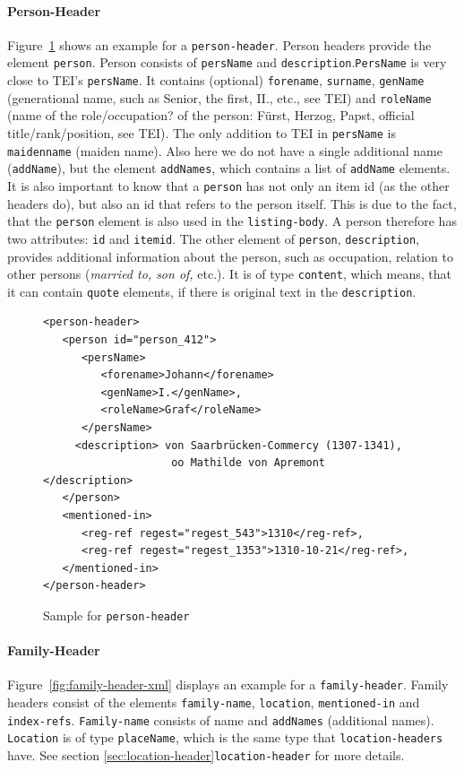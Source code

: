 \paragraph{Person-Header}
Figure~\ref{fig:person-header-xml} shows an example for a \texttt{person-header}. Person headers provide the element \texttt{person}. Person consists of \texttt{persName} and \texttt{description}.\texttt{PersName} is very close to TEI's \texttt{persName}. It contains (optional) \texttt{forename}, \texttt{surname}, \texttt{genName} (generational name, such as Senior, the first, II., etc., see TEI) and \texttt{roleName} (name of the role/occupation? of the person: Fürst, Herzog, Papst, official title/rank/position, see TEI). The only addition to TEI in \texttt{persName} is \texttt{maidenname} (maiden name). Also here we do not have a single additional name (\texttt{addName}), but the element \texttt{addNames}, which contains a list of \texttt{addName} elements. It is also important to know that a \texttt{person} has not only an item id (as the other headers do), but also an id that refers to the person itself. This is due to the fact, that the \texttt{person} element is also used in the \texttt{listing-body}. A person therefore has two attributes: \texttt{id} and \texttt{itemid}.
The other element of \texttt{person}, \texttt{description}, provides additional information about the person, such as occupation, relation to other persons (\textit{married to, son of,} etc.). It is of type \texttt{content}, which means, that it can contain \texttt{quote} elements, if there is original text in the \texttt{description}.

\begin{figure}[H]
\centering
\begin{verbatim}
<person-header>
   <person id="person_412">
      <persName>
         <forename>Johann</forename> 
         <genName>I.</genName>, 
         <roleName>Graf</roleName>
      </persName>
     <description> von Saarbrücken-Commercy (1307-1341), 
                    oo Mathilde von Apremont    </description>
   </person>
   <mentioned-in>
      <reg-ref regest="regest_543">1310</reg-ref>, 
      <reg-ref regest="regest_1353">1310-10-21</reg-ref>, 
   </mentioned-in>
</person-header>
\end{verbatim}
\caption{Sample for \texttt{person-header}}
\label{fig:person-header-xml}
\end{figure}

\paragraph{Family-Header}
Figure~\ref{fig:family-header-xml} displays an example for a \texttt{family-header}. Family headers consist of the elements \texttt{family-name}, \texttt{location}, \texttt{mentioned-in} and \texttt{index-refs}. \texttt{Family-name} consists of name and \texttt{addNames} (additional names). \texttt{Location} is of type \texttt{placeName}, which is the same type that \texttt{location-headers} have. See section \ref{sec:location-header}\texttt{location-header} for more details.

